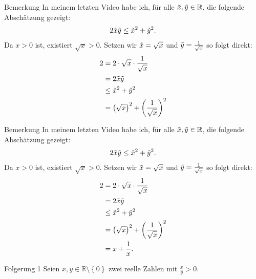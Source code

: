 \documentclass[10pt]{beamer}
\def\bR{\mathbb{R}}
\begin{document}
\begin{frame}{Bemerkung}
    In meinem letzten Video habe ich, für alle \( \Tilde{x}, \Tilde{y} \in \bR \), die folgende Abschätzung gezeigt:
    \begin{align*}
        2\Tilde{x}\Tilde{y}
        \leq \Tilde{x}^{2} + \Tilde{y}^{2}.
    \end{align*}
    Da \( x > 0 \) ist, existiert \( \sqrt{x} > 0 \). Setzen wir \( \Tilde{x} = \sqrt{x} \) und \( \Tilde{y} = \frac{1}{\sqrt{x}} \) so folgt direkt:
    \begin{align*}
        2
        & = 2 \cdot \sqrt{x} \cdot \frac{1}{\sqrt{x}} \\
        & = 2\Tilde{x}\Tilde{y} \\
        & \leq \Tilde{x}^{2} + \Tilde{y}^{2} \\
        & = \left( \sqrt{x} \right)^{2} + \left( \frac{1}{\sqrt{x}} \right)^{2}
    \end{align*}
\end{frame}



\begin{frame}{Bemerkung}
    In meinem letzten Video habe ich, für alle \( \Tilde{x}, \Tilde{y} \in \bR \), die folgende Abschätzung gezeigt:
    \begin{align*}
        2\Tilde{x}\Tilde{y}
        \leq \Tilde{x}^{2} + \Tilde{y}^{2}.
    \end{align*}
    Da \( x > 0 \) ist, existiert \( \sqrt{x} > 0 \). Setzen wir \( \Tilde{x} = \sqrt{x} \) und \( \Tilde{y} = \frac{1}{\sqrt{x}} \) so folgt direkt:
    \begin{align*}
        2
        & = 2 \cdot \sqrt{x} \cdot \frac{1}{\sqrt{x}} \\
        & = 2\Tilde{x}\Tilde{y} \\
        & \leq \Tilde{x}^{2} + \Tilde{y}^{2} \\
        & = \left( \sqrt{x} \right)^{2} + \left( \frac{1}{\sqrt{x}} \right)^{2} \\
        & = x + \frac{1}{x}.
    \end{align*}
\end{frame}



\begin{frame}{Folgerung 1}
    Seien \( x, y \in \bR \setminus \left\{ 0 \right\} \) zwei reelle Zahlen mit \( \frac{x}{y} > 0 \).
\end{frame}
\end{document}
